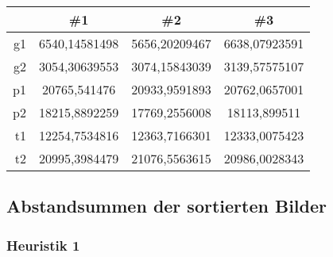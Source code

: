 \begin{center}
    \begin{tabular}{|r|S[table-format=5.8]|S[table-format=5.8]|S[table-format=5.8]|}
        \hline
         & {\#1} & {\#2} & {\#3} \\\hline
        g1 & 6540,14581498 & 5656,20209467 & 6638,07923591 \\\hline
        g2 & 3054,30639553 & 3074,15843039 & 3139,57575107 \\\hline
        p1 & 20765,541476  & 20933,9591893 & 20762,0657001 \\\hline
        p2 & 18215,8892259 & 17769,2556008 & 18113,899511  \\\hline
        t1 & 12254,7534816 & 12363,7166301 & 12333,0075423 \\\hline
        t2 & 20995,3984479 & 21076,5563615 & 20986,0028343 \\\hline
    \end{tabular}
\end{center}


\newpage

\subsection{Abstandsummen der sortierten Bilder} \label{subsec:app_sumSort}

\subsubsection{Heuristik 1} \label{subsubsec:app_heuristik1_qualität}

